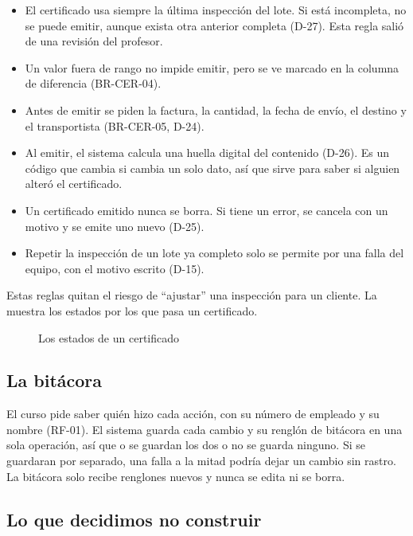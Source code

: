 \begin{itemize}
  \item El certificado usa siempre la última inspección del lote. Si está incompleta, no se puede emitir, aunque exista otra anterior completa (D-27). Esta regla salió de una revisión del profesor.
  \item Un valor fuera de rango no impide emitir, pero se ve marcado en la columna de diferencia (BR-CER-04).
  \item Antes de emitir se piden la factura, la cantidad, la fecha de envío, el destino y el transportista (BR-CER-05, D-24).
  \item Al emitir, el sistema calcula una huella digital del contenido (D-26). Es un código que cambia si cambia un solo dato, así que sirve para saber si alguien alteró el certificado.
  \item Un certificado emitido nunca se borra. Si tiene un error, se cancela con un motivo y se emite uno nuevo (D-25).
  \item Repetir la inspección de un lote ya completo solo se permite por una falla del equipo, con el motivo escrito (D-15).
\end{itemize}

Estas reglas quitan el riesgo de \enquote{ajustar} una inspección para un cliente. La  muestra los estados por los que pasa un certificado.

\begin{figure}[H]
  \centering
  
  \caption{Los estados de un certificado}\label{fig:certificado}
\end{figure}

\subsection{La bitácora}\label{sec:bitacora}

El curso pide saber quién hizo cada acción, con su número de empleado y su nombre (RF-01). El sistema guarda cada cambio y su renglón de bitácora en una sola operación, así que o se guardan los dos o no se guarda ninguno. Si se guardaran por separado, una falla a la mitad podría dejar un cambio sin rastro. La bitácora solo recibe renglones nuevos y nunca se edita ni se borra.

\subsection{Lo que decidimos no construir}\label{sec:fuera}

